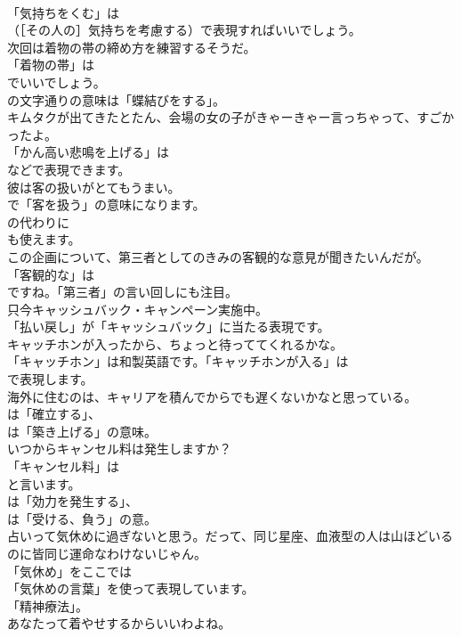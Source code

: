 \documentclass[8pt]{extreport}
\begin{document}
\begin{CJK}{UTF8}{min}
\\	「気持ちをくむ」は 
\\	（［その人の］気持ちを考慮する）で表現すればいいでしょう。	
\\	次回は着物の帯の締め方を練習するそうだ。 
\\	「着物の帯」は
\\	でいいでしょう。
\\	の文字通りの意味は「蝶結びをする」。	
\\	キムタクが出てきたとたん、会場の女の子がきゃーきゃー言っちゃって、すごかったよ。 
\\	「かん高い悲鳴を上げる」は
\\	などで表現できます。	
\\	彼は客の扱いがとてもうまい。 
\\	で「客を扱う」の意味になります。
\\	の代わりに 
\\	も使えます。	
\\	この企画について、第三者としてのきみの客観的な意見が聞きたいんだが。 
\\	「客観的な」は
\\	ですね。「第三者」の言い回しにも注目。	
\\	只今キャッシュバック・キャンペーン実施中。 
\\	「払い戻し」が「キャッシュバック」に当たる表現です。	
\\	キャッチホンが入ったから、ちょっと待っててくれるかな。 
\\	「キャッチホン」は和製英語です。「キャッチホンが入る」は
\\	で表現します。	
\\	海外に住むのは、キャリアを積んでからでも遅くないかなと思っている。 
\\	は「確立する」、
\\	は「築き上げる」の意味。	
\\	いつからキャンセル料は発生しますか？ 
\\	「キャンセル料」は
\\	と言います。
\\	は「効力を発生する」、
\\	は「受ける、負う」の意。	
\\	占いって気休めに過ぎないと思う。だって、同じ星座、血液型の人は山ほどいるのに皆同じ運命なわけないじゃん。 
\\	「気休め」をここでは
\\	「気休めの言葉」を使って表現しています。
\\	「精神療法」。	
\\	あなたって着やせするからいいわよね。 

\end{CJK}
\end{document}
